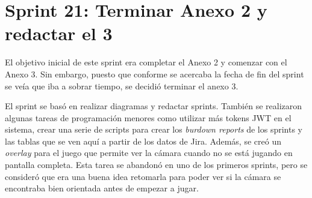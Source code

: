 

\section{Sprint 21: Terminar Anexo 2 y redactar el 3}
\label{anexo3:sec:sprint21}

El objetivo inicial de este sprint era completar el Anexo 2 y comenzar con el Anexo 3. Sin embargo,
puesto que conforme se acercaba la fecha de fin del sprint se veía que iba a sobrar tiempo, se decidió
terminar el anexo 3.

El sprint se basó en realizar diagramas y redactar sprints. También se realizaron algunas tareas de
programación menores como utilizar más tokens JWT en el sistema, crear una serie de scripts para crear
los \textit{burdown reports} de los sprints y las tablas que se ven aquí a partir de los datos de Jira.
Además, se creó un \textit{overlay} para el juego que permite ver la cámara cuando no se está jugando en pantalla
completa. Esta tarea se abandonó en uno de los primeros sprints, pero se consideró que era una buena
idea retomarla para poder ver si la cámara se encontraba bien orientada antes de empezar a jugar.

